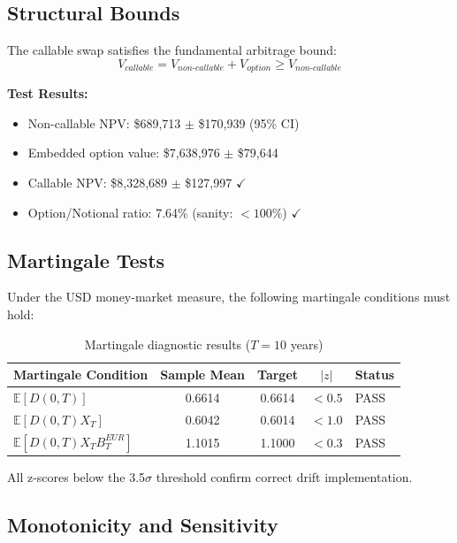 \documentclass[conference]{IEEEtran}
\begin{document}
\subsection{Structural Bounds}

The callable swap satisfies the fundamental arbitrage bound:
\[V_{callable} = V_{non\text{-}callable} + V_{option} \geq V_{non\text{-}callable}\]

\textbf{Test Results:}
\begin{itemize}
    \item Non-callable NPV: \$689,713 $\pm$ \$170,939 (95\% CI)
    \item Embedded option value: \$7,638,976 $\pm$ \$79,644
    \item Callable NPV: \$8,328,689 $\pm$ \$127,997 \textcolor{pass}{$\checkmark$}
    \item Option/Notional ratio: 7.64\% (sanity: $<100\%$) \textcolor{pass}{$\checkmark$}
\end{itemize}

\subsection{Martingale Tests}

Under the USD money-market measure, the following martingale conditions must hold:

\begin{table}[H]
\centering
\begin{tabular}{lcccl}
\toprule
\textbf{Martingale Condition} & \textbf{Sample Mean} & \textbf{Target} & $|z|$ & \textbf{Status}\\
\midrule
$\mathbb{E}[D(0,T)]$ & 0.6614 & 0.6614 & $<0.5$ & \textcolor{pass}{PASS} \\
$\mathbb{E}[D(0,T)X_T]$ & 0.6042 & 0.6014 & $<1.0$ & \textcolor{pass}{PASS} \\
$\mathbb{E}[D(0,T)X_T B_T^{EUR}]$ & 1.1015 & 1.1000 & $<0.3$ & \textcolor{pass}{PASS} \\
\bottomrule
\end{tabular}
\caption{Martingale diagnostic results ($T=10$ years)}
\end{table}

All z-scores below the 3.5$\sigma$ threshold confirm correct drift implementation.

\subsection{Monotonicity and Sensitivity}
\end{document}
